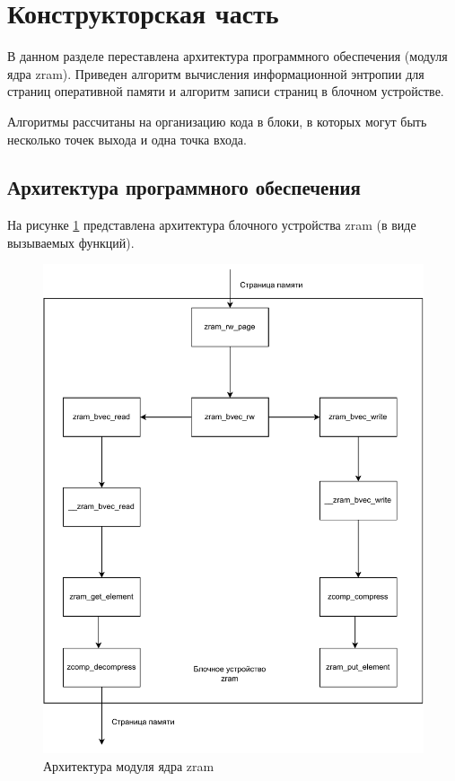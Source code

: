 \section{Конструкторская часть}

В данном разделе переставлена архитектура программного обеспечения (модуля ядра zram). Приведен алгоритм вычисления информационной энтропии для страниц оперативной памяти и алгоритм записи страниц в блочном устройстве.

Алгоритмы рассчитаны на организацию кода в блоки, в которых могут быть несколько точек выхода и одна точка входа.

\subsection{Архитектура программного обеспечения}

На рисунке \ref{fig:zram-archeticture} представлена архитектура блочного устройства zram (в виде вызываемых функций).

\begin{figure}[h]
	\centering
	\includegraphics[scale=1]{img/zram-arch.pdf}
	\caption{Архитектура модуля ядра zram}
	\label{fig:zram-archeticture}
\end{figure}

